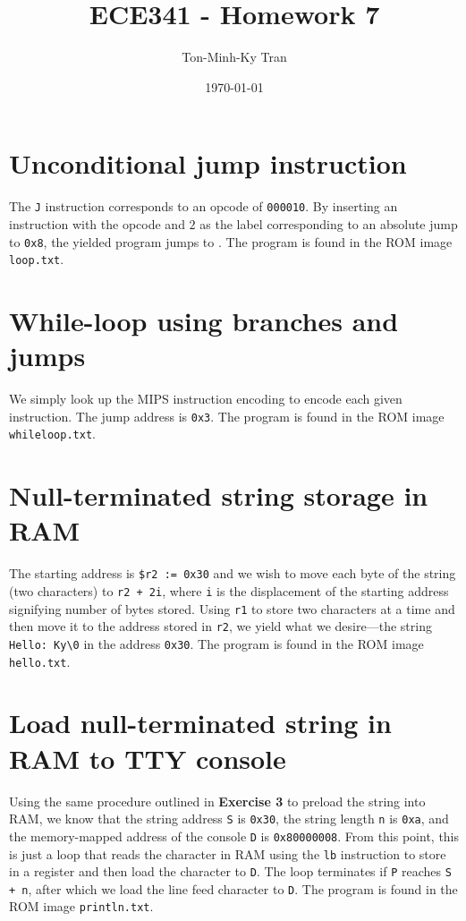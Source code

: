 \documentclass{exam}
\title{ECE341 - Homework 7}
\author{Ton-Minh-Ky Tran}
\date{\today}
\begin{document}
\maketitle
\section{Unconditional jump instruction}
The \verb|J| instruction corresponds to an opcode of \verb|000010|. By inserting an instruction with the opcode and $2$ as the label corresponding to an absolute jump to \verb|0x8|, the yielded program jumps to . The program is found in the ROM image \verb|loop.txt|.

\section{While-loop using branches and jumps}
We simply look up the MIPS instruction encoding to encode each given instruction. The jump address is \verb|0x3|. The program is found in the ROM image \verb|whileloop.txt|.

\section{Null-terminated string storage in RAM}
The starting address is \verb|$r2 := 0x30| and we wish to move each byte of the string (two characters) to \verb|r2 + 2i|, where \verb|i| is the displacement of the starting address signifying number of bytes stored. Using \verb|r1| to store two characters at a time and then move it to the address stored in \verb|r2|, we yield what we desire---the string \verb|Hello: Ky\0| in the address \verb|0x30|. The program is found in the ROM image \verb|hello.txt|.

\section{Load null-terminated string in RAM to TTY console}
Using the same procedure outlined in \textbf{Exercise 3} to preload the string into RAM, we know that the string address \verb|S| is \verb|0x30|, the string length \verb|n| is \verb|0xa|, and the memory-mapped address of the console \verb|D| is \verb|0x80000008|. From this point, this is just a loop that reads the character in RAM using the \verb|lb| instruction to store in a register and then load the character to \verb|D|. The loop terminates if \verb|P| reaches \verb|S + n|, after which we load the line feed character to \verb|D|. The program is found in the ROM image \verb|println.txt|.
\end{document}
